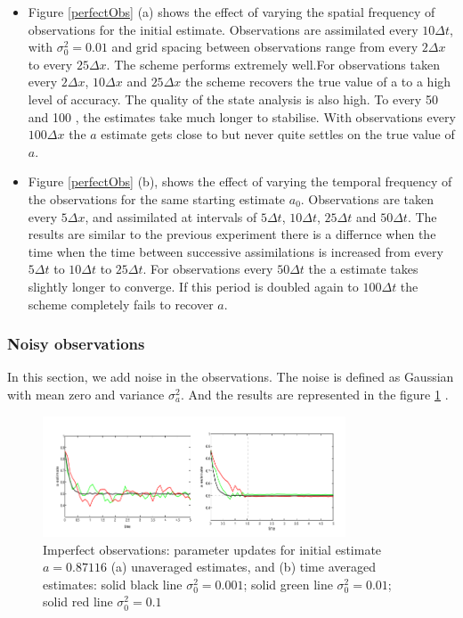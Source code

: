 \documentclass[a4,12pt]{article}
\numberwithin{equation}{section}
\begin{document}
\begin{itemize}
    

\item  Figure \ref{perfectObs} (a) shows the effect of varying the spatial frequency of observations for the initial estimate. Observations are assimilated every $10\Delta t$, with $\sigma_0^2 = 0.01$ and grid spacing between observations range from every $2\Delta x$ to every $25\Delta x$. The scheme performs extremely well.For observations taken every $2\Delta x$, $10\Delta x$ and $25\Delta x$ the scheme recovers the true value of a to a high level of accuracy. The quality of the state analysis is also high. To every 50 and 100 , the estimates take much longer to stabilise. With observations every $100\Delta x$ the $a$ estimate gets close to but never quite settles on the true value of $a$. 

\item  Figure \ref{perfectObs} (b), shows the effect of varying the temporal frequency of the observations for the same starting estimate $a_0$. Observations are taken every $5\Delta x$, and assimilated at intervals of $5\Delta t$, $10\Delta t$, $25\Delta t$ and $50\Delta t$. The results are similar to the previous experiment there is a differnce when the time when the time between successive assimilations is increased from every $5\Delta t$ to $10\Delta t$ to $25\Delta t$. For observations every $50\Delta t$ the a estimate takes slightly longer to converge. If this period is doubled again to $100\Delta t$ the scheme completely fails to recover $a$.
\end{itemize}

\subsubsection{Noisy observations}
In this section, we add noise in the observations. The noise is defined as Gaussian with mean zero and variance $\sigma_a^2$. And the results are represented in the figure \ref{noisyObs} \cite{HybridSequential}.
\begin{figure}[h]
    \begin{center}
    \includegraphics[width=9cm]{../Image/noisyObs.png}
    \caption{Imperfect observations: parameter updates for initial estimate $a = 0.87116$ (a) unaveraged estimates, and (b) time averaged estimates: solid black line $\sigma_0^2 = 0.001$; solid green line $\sigma_0^2 = 0.01$; solid red line $\sigma_0^2= 0.1$}
    \label{noisyObs}
    \end{center}
\end{figure}
\end{document}
